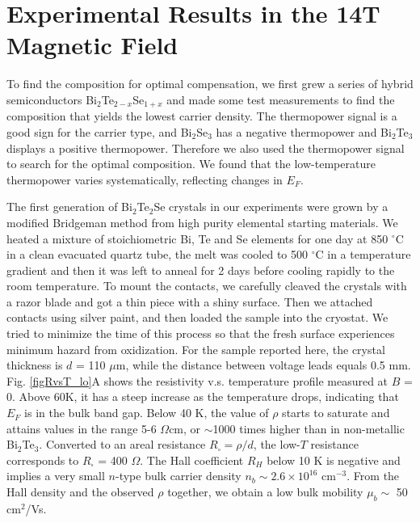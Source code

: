 \section{Experimental Results in the 14T Magnetic Field}
\label{sec:bts:result14T}







To find the composition for optimal compensation, we first grew a series of hybrid semiconductors Bi$_2$Te$_{2-x}$Se$_{1+x}$ and made some test measurements to find the composition that yields the lowest carrier density. The thermopower signal is a good sign for the carrier type, and Bi$_2$Se$_3$ has a negative thermopower and Bi$_2$Te$_3$ displays a positive thermopower. Therefore we also used the thermopower signal to search for the optimal composition. We found that the low-temperature thermopower varies systematically, reflecting changes in $E_F$. 

The first generation of Bi$_2$Te$_2$Se crystals in our experiments were grown by a modified Bridgeman method from high purity elemental starting materials. We heated a mixture of stoichiometric Bi, Te and Se elements for one day at 850 $^{\circ}$C in a clean evacuated quartz tube, the melt was cooled to 500 $^{\circ}$C in a temperature gradient and then it was left to anneal for 2 days before cooling rapidly to the room temperature. To mount the contacts, we carefully cleaved the crystals with a razor blade and got a thin piece with a shiny surface. Then we attached contacts using silver paint, and then loaded the sample into the cryostat. We tried to minimize the time of this process so that the fresh surface experiences minimum hazard from oxidization. For the sample reported here, the crystal thickness is $d$ = 110 $\mu$m, while the distance between voltage leads equals 0.5 mm.  Fig. \ref{figRvsT_lo}A shows the resistivity v.s. temperature profile measured at $B$ = 0. Above 60K, it has a steep increase as the temperature drops, indicating that $E_F$ is in the bulk band gap. Below 40 K, the value of $\rho$ starts to saturate and attains values in the range 5-6 $\Omega$cm, or $\sim$1000 times higher than in non-metallic Bi$_2$Te$_3$. Converted to an areal resistance $R_{\square}= \rho/d$, the low-$T$ resistance corresponds to $R_{\square}$ = 400 $\Omega$. The Hall coefficient $R_H$ below 10 K is negative and implies a very small $n$-type bulk carrier density $n_b\sim 2.6\times 10^{16}$ cm$^{-3}$. From the Hall density and the observed $\rho$ together, we obtain a low bulk mobility $\mu_b\sim$ 50 cm$^2$/Vs.

